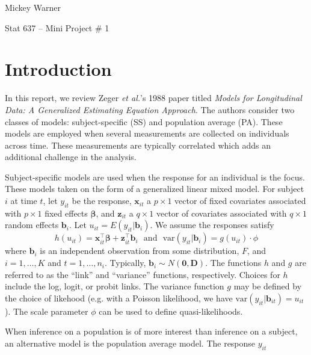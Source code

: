 \documentclass[12pt]{article}
\newcommand{\m}[1]{\mathbf{\bm{#1}}}
\newcommand{\var}{\mathrm{var}}
\begin{document}
\noindent Mickey Warner
\bigskip

\noindent Stat 637 -- Mini Project \# 1

\section*{Introduction}

\noindent In this report, we review Zeger \emph{et al.}'s 1988 paper titled \emph{Models for Longitudinal Data: A Generalized Estimating Equation Approach}. The authors consider two classes of models: subject-specific (SS) and population average (PA). These models are employed when several measurements are collected on individuals across time. These measurements are typically correlated which adds an additional challenge in the analysis.
\bigskip

\noindent Subject-specific models are used when the response for an individual is the focus. These models taken on the form of a generalized linear mixed model. For subject $i$ at time $t$, let $y_{it}$ be the response, $\m{x}_{it}$ a $p\times 1$ vector of fixed covariates associated with $p\times 1$ fixed effects $\m{\beta}$, and $\m{z}_{it}$ a $q\times 1$ vector of covariates associated with $q\times 1$ random effects $\m{b}_i$. Let $u_{it}=E(y_{it}|\m{b}_i)$. We assume the responses satisfy
\[ h(u_{it}) = \m{x}_{it}^\top\m{\beta} + \m{z}_{it}^\top\m{b}_i ~~~\mathrm{and}~~~ \var(y_{it}|\m{b}_i) = g(u_{it})\cdot \phi \]
where $\m{b}_i$ is an independent observation from some distribution, $F$, and $i=1,\ldots,K$ and $t=1,\ldots,n_i$. Typically, $\m{b}_i\sim N(\m{0}, \m{D})$. The functions $h$ and $g$ are referred to as the ``link'' and ``variance'' functions, respectively. Choices for $h$ include the log, logit, or probit links. The variance function $g$ may be defined by the choice of likehood (e.g. with a Poisson likelihood, we have $\mathrm{var}(y_{it}|\m{b}_{it})=u_{it}$). The scale parameter $\phi$ can be used to define quasi-likelihoods.
\bigskip

\noindent When inference on a population is of more interest than inference on a subject, an alternative model is the population average model. The response $y_{it}$
\end{document}
